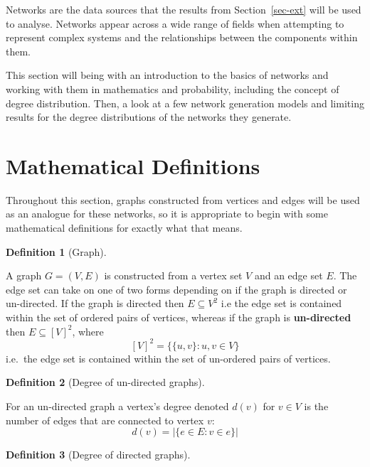 \documentclass[
  10pt,
  a4paper,
]{scrreprt}
\theoremstyle{definition}
\newtheorem{definition}{Definition}[section]
\theoremstyle{plain}
\theoremstyle{plain}
\theoremstyle{remark}
\begin{document}
{Networks are the data sources that the results from
Section~\ref{sec-ext} will be used to analyse. Networks appear across a
wide range of fields when attempting to represent complex systems and
the relationships between the components within them.

This section will being with an introduction to the basics of networks
and working with them in mathematics and probability, including the
concept of degree distribution. Then, a look at a few network generation
models and limiting results for the degree distributions of the networks
they generate.

\hypertarget{mathematical-definitions}{%
\section{Mathematical Definitions}\label{mathematical-definitions}}

Throughout this section, graphs constructed from vertices and edges will
be used as an analogue for these networks, so it is appropriate to begin
with some mathematical definitions for exactly what that means.

\begin{definition}[Graph]\protect\hypertarget{def-net}{}\label{def-net}

A graph \(G = (V,E)\) is constructed from a vertex set \(V\) and an edge
set \(E\). The edge set can take on one of two forms depending on if the
graph is directed or un-directed. If the graph is directed then
\(E\subseteq V^2\) i.e the edge set is contained within the set of
ordered pairs of vertices, whereas if the graph is \textbf{un-directed}
then \(E\subseteq [V]^2\), where \[
[V]^2 = \{\{u,v\}:u,v\in V\}
\] i.e.~the edge set is contained within the set of un-ordered pairs of
vertices.

\end{definition}

\begin{definition}[Degree of un-directed
graphs]\protect\hypertarget{def-deg}{}\label{def-deg}

For an un-directed graph a vertex's degree denoted \(d(v)\) for
\(v\in V\) is the number of edges that are connected to vertex \(v\): \[
d(v) = |\{e\in E : v \in e\}|
\]

\end{definition}

\begin{definition}[Degree of directed
graphs]\protect\hypertarget{def-dirdeg}{}\label{def-dirdeg}


\end{definition}}
\end{document}
